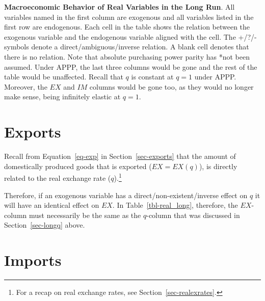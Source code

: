 \documentclass[
  letterpaper,
]{book}
\theoremstyle{plain}
\theoremstyle{remark}
\begin{document}
\begin{table}

\caption{\label{tbl-real_long}\textbf{Macroeconomic Behavior of Real
Variables in the Long Run}. All variables named in the first column are
exogenous and all variables listed in the first row are endogenous. Each
cell in the table shows the relation between the exogenous variable and
the endogenous variable aligned with the cell. The +/?/- symbols denote
a direct/ambiguous/inverse relation. A blank cell denotes that there is
no relation. Note that absolute purchasing power parity has *not been
assumed. Under APPP, the last three columns would be gone and the rest
of the table would be unaffected. Recall that \(q\) is constant at
\(q=1\) under APPP. Moreover, the \(EX\) and \(IM\) columns would be
gone too, as they would no longer make sense, being infinitely elastic
at \(q=1\).}


\end{table}%

\section{Exports}\label{sec-longexp}

Recall from Equation~\ref{eq-exp} in Section~\ref{sec-exports} that the
amount of domestically produced goods that is exported (\(EX=EX(q)\)),
is directly related to the real exchange rate (\(q\)).\footnote{For a
  recap on real exchange rates, see Section~\ref{sec-realexrates}.}

Therefore, if an exogenous variable has a direct/non-existent/inverse
effect on \(q\) it will have an identical effect on \(EX\). In
Table~\ref{tbl-real_long}, therefore, the \(EX\)-column must necessarily
be the same as the \(q\)-column that was discussed in
Section~\ref{sec-longq} above.

\section{Imports}\label{sec-longimp}
\end{document}
